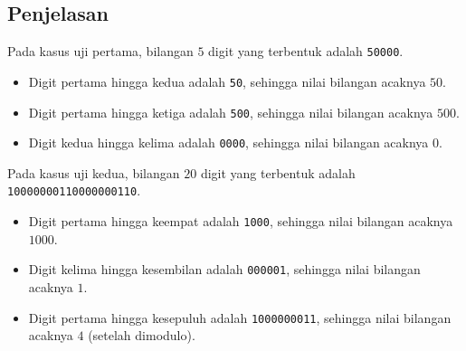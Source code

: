 \documentclass{article}
\begin{document}
\subsection*{Penjelasan}
Pada kasus uji pertama, bilangan $5$ digit yang terbentuk adalah \lstinline{50000}.

\begin{itemize}
    \setlength\itemsep{0pt}
    \item Digit pertama hingga kedua adalah \lstinline{50}, sehingga nilai bilangan acaknya $50$.
    \item Digit pertama hingga ketiga adalah \lstinline{500}, sehingga nilai bilangan acaknya $500$.
    \item Digit kedua hingga kelima adalah \lstinline{0000}, sehingga nilai bilangan acaknya $0$.
\end{itemize}

Pada kasus uji kedua, bilangan $20$ digit yang terbentuk adalah \lstinline{10000000110000000110}.

\begin{itemize}
    \setlength\itemsep{0pt}
    \item Digit pertama hingga keempat adalah \lstinline{1000}, sehingga nilai bilangan acaknya $1000$.
    \item Digit kelima hingga kesembilan adalah \lstinline{000001}, sehingga nilai bilangan acaknya $1$.
    \item Digit pertama hingga kesepuluh adalah \lstinline{1000000011}, sehingga nilai bilangan acaknya $4$ (setelah dimodulo).
\end{itemize}
\end{document}
